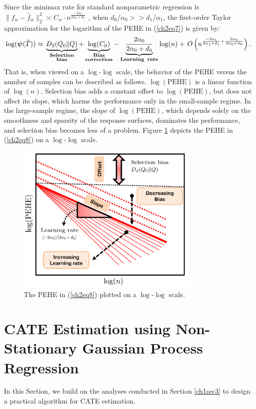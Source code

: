 \documentclass [PhD] {uclathes}
\begin{document}
Since the minimax rate for standard nonparametric regression is $\|f_w-\hat{f}_w\|^2_{2} \asymp C_w \cdot n^{\frac{-2\alpha_w}{2\alpha_w + d_w}}$ \cite{stone1982optimal}, when $d_0/\alpha_0 >> d_1/\alpha_1$, the first-order Taylor approximation for the logarithm of the PEHE in (\ref{ch2eq7}) is given by:
\begin{align}
\log(\mathbold{\psi}(\hat{T})) \approx \, \underbrace{D_2(Q_0\|Q)}_{\substack{\textbf{Selection}\\ \textbf{bias}}} + \underbrace{\log(C_0)}_{\substack{\textbf{Bias}\\ \textbf{correction}}} - \underbrace{\frac{2\alpha_0}{2\alpha_0 + d_0}}_{\substack{\textbf{Learning\, rate}}}\log(n) +\, O\left(n^{\frac{-2\alpha_1}{2\alpha_1 + d_1}+\frac{2\alpha_0}{2\alpha_0 + d_0}}\right).
\label{ch2eq8}
\end{align}
That is, when viewed on a $\log$-$\log$ scale, the behavior of the PEHE versus the number of samples can be described as follows. $\log(\mbox{PEHE})$ is a linear function of $\log(n)$. Selection bias adds a constant offset to $\log(\mbox{PEHE})$, but does not affect its slope, which harms the performance only in the small-sample regime. In the large-sample regime, the slope of $\log(\mbox{PEHE})$, which depends solely on the smoothness and sparsity of the response surfaces, dominates the performance, and selection bias becomes less of a problem. Figure \ref{ch2fig1} depicts the PEHE in (\ref{ch2eq8}) on a $\log$-$\log$ scale.
		
\begin{figure}[t]
\centering
\includegraphics[width=3.5in]{logpehe.pdf}
\caption{The PEHE in (\ref{ch2eq8}) plotted on a $\log$-$\log$ scale.}
\label{ch2fig1}
\end{figure}
 
\section{CATE Estimation using Non-Stationary Gaussian Process Regression}
\label{ch2sec4}
In this Section, we build on the analyses conducted in Section \ref{ch1sec3} to design a practical algorithm for CATE estimation. 
\end{document}
